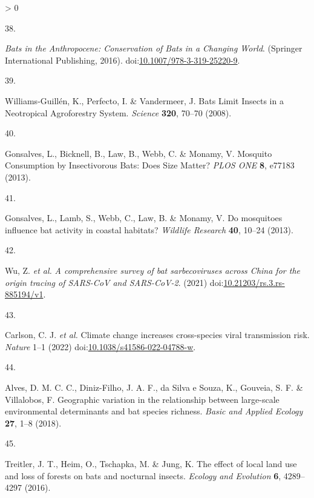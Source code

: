 \documentclass[11pt]{article}
\newlength{\cslhangindent}
\newlength{\csllabelwidth}
\newenvironment{CSLReferences}[3] %
 {%
  \setlength{\parindent}{0pt}
  \ifodd #1 \everypar{\setlength{\hangindent}{\cslhangindent}}\ignorespaces\fi
  \ifnum #2 > 0
  \setlength{\parskip}{#2\baselineskip}
  \fi
 }%
 {}
\newcommand{\CSLLeftMargin}[1]{\parbox[t]{\maxof{\widthof{#1}}{\csllabelwidth}}{#1}}
\newcommand{\CSLRightInline}[1]{\parbox[t]{\linewidth}{#1}}
\begin{document}
\begin{CSLReferences}{0}{0}
\leavevmode\hypertarget{ref-Voigt2016BatAnt}{}%
\CSLLeftMargin{38. }
\CSLRightInline{\emph{Bats in the Anthropocene: Conservation of Bats in
a Changing World}. (Springer International Publishing, 2016).
doi:\href{https://doi.org/10.1007/978-3-319-25220-9}{10.1007/978-3-319-25220-9}.}

\leavevmode\hypertarget{ref-Williams-Guillen2008BatLim}{}%
\CSLLeftMargin{39. }
\CSLRightInline{Williams-Guillén, K., Perfecto, I. \& Vandermeer, J.
Bats Limit Insects in a Neotropical Agroforestry System. \emph{Science}
\textbf{320}, 70--70 (2008).}

\leavevmode\hypertarget{ref-Gonsalves2013MosCon}{}%
\CSLLeftMargin{40. }
\CSLRightInline{Gonsalves, L., Bicknell, B., Law, B., Webb, C. \&
Monamy, V. Mosquito Consumption by Insectivorous Bats: Does Size Matter?
\emph{PLOS ONE} \textbf{8}, e77183 (2013).}

\leavevmode\hypertarget{ref-Gonsalves2013MosInf}{}%
\CSLLeftMargin{41. }
\CSLRightInline{Gonsalves, L., Lamb, S., Webb, C., Law, B. \& Monamy, V.
Do mosquitoes influence bat activity in coastal habitats? \emph{Wildlife
Research} \textbf{40}, 10--24 (2013).}

\leavevmode\hypertarget{ref-Wu2021ComSur}{}%
\CSLLeftMargin{42. }
\CSLRightInline{Wu, Z. \emph{et al.} \emph{A comprehensive survey of bat
sarbecoviruses across China for the origin tracing of SARS-CoV and
SARS-CoV-2}. (2021)
doi:\href{https://doi.org/10.21203/rs.3.rs-885194/v1}{10.21203/rs.3.rs-885194/v1}.}

\leavevmode\hypertarget{ref-Carlson2022CliCha}{}%
\CSLLeftMargin{43. }
\CSLRightInline{Carlson, C. J. \emph{et al.} Climate change increases
cross-species viral transmission risk. \emph{Nature} 1--1 (2022)
doi:\href{https://doi.org/10.1038/s41586-022-04788-w}{10.1038/s41586-022-04788-w}.}

\leavevmode\hypertarget{ref-Alves2018GeoVar}{}%
\CSLLeftMargin{44. }
\CSLRightInline{Alves, D. M. C. C., Diniz-Filho, J. A. F., da Silva e
Souza, K., Gouveia, S. F. \& Villalobos, F. Geographic variation in the
relationship between large-scale environmental determinants and bat
species richness. \emph{Basic and Applied Ecology} \textbf{27}, 1--8
(2018).}

\leavevmode\hypertarget{ref-Treitler2016EffLoc}{}%
\CSLLeftMargin{45. }
\CSLRightInline{Treitler, J. T., Heim, O., Tschapka, M. \& Jung, K. The
effect of local land use and loss of forests on bats and nocturnal
insects. \emph{Ecology and Evolution} \textbf{6}, 4289--4297 (2016).}


\end{CSLReferences}
\end{document}
